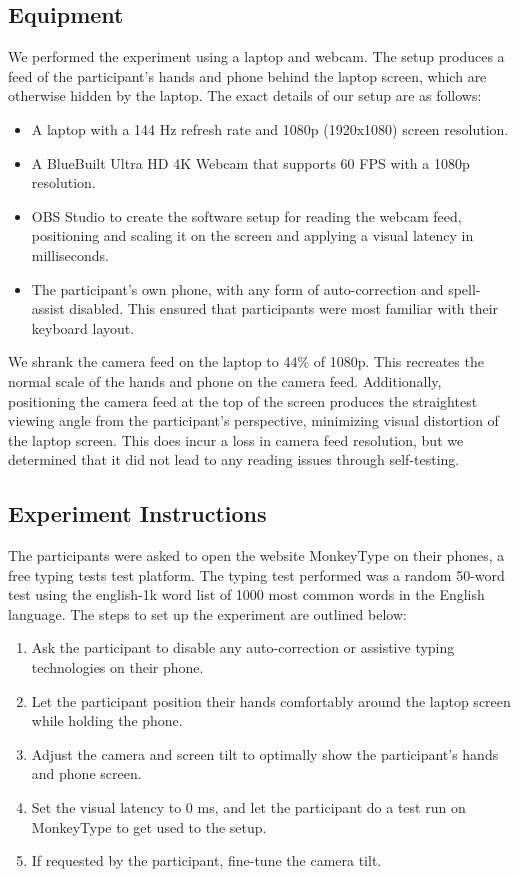 \subsection{Equipment}

We performed the experiment using a laptop and webcam.
The setup produces a feed of the participant's hands and phone behind the laptop screen, which are otherwise hidden by the laptop. The exact details of our setup are as follows:

\begin{itemize}
	\item A laptop with a 144 Hz refresh rate and 1080p (1920x1080) screen resolution.
	\item A BlueBuilt Ultra HD 4K Webcam that supports 60 FPS with a 1080p resolution.
	\item OBS Studio to create the software setup for reading the webcam feed,
		positioning and scaling it on the screen and applying a visual latency in milliseconds.
	\item The participant's own phone, with any form of auto-correction and spell-assist disabled.
		This ensured that participants were most familiar with their keyboard layout.
\end{itemize}

We shrank the camera feed on the laptop to 44\% of 1080p.
This recreates the normal scale of the hands and phone on the camera feed.
Additionally, positioning the camera feed at the top
of the screen produces the straightest viewing angle from the participant's perspective,
minimizing visual distortion of the laptop screen.
This does incur a loss in camera feed resolution, but we determined that it did not lead to any reading issues through self-testing.

\subsection{Experiment Instructions}

The participants were asked to open the website MonkeyType \cite{monkeytype} on their phones,
a free typing tests test platform.
The typing test performed was a random 50-word test using the english-1k word list of 1000 most common
words in the English language. The steps to set up the experiment are outlined below:

\begin{enumerate}
	\item Ask the participant to disable any auto-correction or assistive typing technologies on their
		phone.
	\item Let the participant position their hands comfortably around the laptop screen while holding the phone.
	\item Adjust the camera and screen tilt to optimally show the participant's hands and phone screen.
	\item Set the visual latency to 0 ms, and let the participant do a test run on MonkeyType to get used to the setup.
	\item If requested by the participant, fine-tune the camera tilt.
\end{enumerate}

